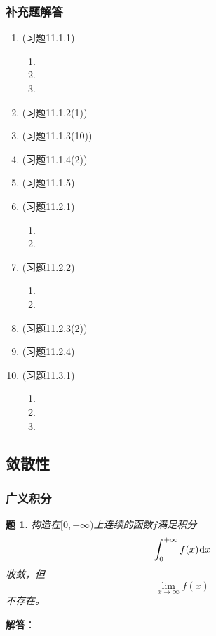 \documentclass[a4paper,UTF8,fontset=windows,AutoFakeBold]{ctexart}
\newcommand*{\dr}{\hspace{0.07em}\mathrm{d}}
\theoremstyle{ex}
\newtheorem{exercise}{题}
\newcommand{\sol}[1]{{\vspace{5pt}\kaishu\noindent\textbf{解答}：\vspace{-3pt}
\begin{compactitem}
    \item[] #1
\end{compactitem}
}}
\begin{document}
\subsubsection{补充题解答}
\begin{enumerate}
    \item (习题11.1.1)
    \begin{enumerate}
        \item[(3)] 
        \item[(4)] 
        \item[(13)] 
    \end{enumerate}
    \item (习题11.1.2(1))
    \item (习题11.1.3(10))
    \item (习题11.1.4(2))
    \item (习题11.1.5)
    \item (习题11.2.1)
    \begin{enumerate}
        \item[(3)] 
        \item[(5)] 
    \end{enumerate}
    \item (习题11.2.2)
    \begin{enumerate}
        \item[(2)] 
        \item[(4)] 
    \end{enumerate}
    \item (习题11.2.3(2))
    \item (习题11.2.4)
    \item (习题11.3.1)
    \begin{enumerate}
        \item[(1)] 
        \item[(3)] 
        \item[(5)] 
    \end{enumerate}
\end{enumerate}

\subsection{敛散性}
\subsubsection{广义积分}
\begin{framed}
\begin{exercise}
    构造在$[0,+\infty)$上连续的函数$f$满足积分
    $$\int_0^{+\infty}f(x)\dr x$$
    收敛，但
    $$\lim_{x\to\infty}f(x)$$
    不存在。
\end{exercise}
\sol{

}
\end{framed}
\end{document}
